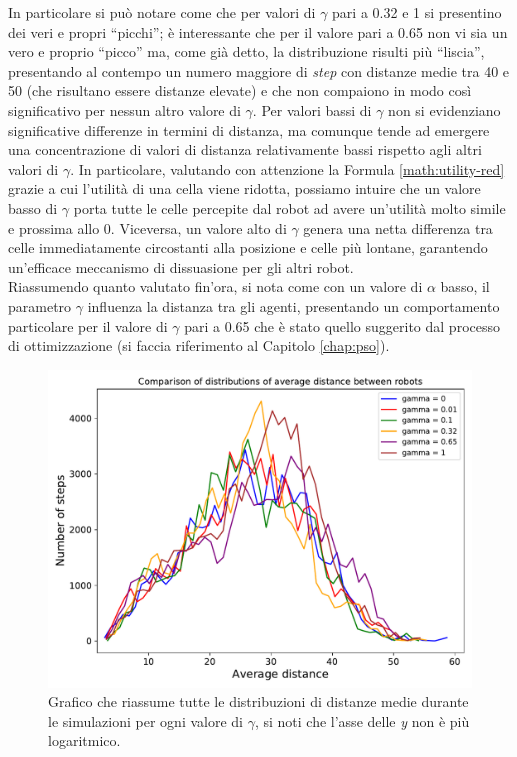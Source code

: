 In particolare si può notare come che per valori di $\gamma$ pari a 0.32 e 1 si presentino dei veri e propri “picchi”; è interessante che per il valore pari a 0.65 non vi sia un vero e proprio “picco” ma, come già detto, la distribuzione risulti più “liscia”, presentando al contempo un numero maggiore di \textit{step} con distanze medie tra 40 e 50 (che risultano essere distanze elevate) e che non compaiono in modo così significativo per nessun altro valore di $\gamma$.
Per valori bassi di $\gamma$ non si evidenziano significative differenze in termini di distanza, ma comunque tende ad emergere una concentrazione di valori di distanza relativamente bassi rispetto agli altri valori di $\gamma$.
In particolare, valutando con attenzione la Formula \ref{math:utility-red} grazie a cui l'utilità di una cella viene ridotta, possiamo intuire che un valore basso di $\gamma$ porta tutte le celle percepite dal robot ad avere un'utilità molto simile e prossima allo $0$. Viceversa, un valore alto di $\gamma$ genera una netta differenza tra celle immediatamente circostanti alla posizione e celle più lontane, garantendo un'efficace meccanismo di dissuasione per gli altri robot.\\
Riassumendo quanto valutato fin'ora, si nota come con un valore di $\alpha$ basso, il parametro $\gamma$ influenza la distanza tra gli agenti, presentando un comportamento particolare per il valore di $\gamma$ pari a 0.65 che è stato quello suggerito dal processo di ottimizzazione (si faccia riferimento al Capitolo \ref{chap:pso}).
\begin{figure}
	\centering
	\includegraphics[width=0.9\linewidth]{images/gamma_results/low_alpha/comparison}
	\caption{Grafico che riassume tutte le distribuzioni di distanze medie durante le simulazioni per ogni valore di $\gamma$, si noti che l'asse delle \textit{y} non è più logaritmico.}
	\label{fig:gammaComparison}
\end{figure}

